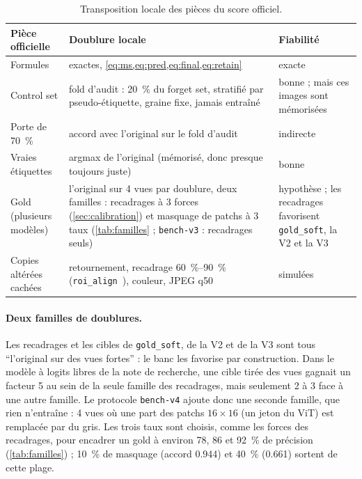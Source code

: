 \documentclass[11pt,a4paper]{article}
\newcommand{\code}[1]{\texttt{#1}}
\begin{document}
\begin{table}[ht]
  \centering\small
  \caption{Transposition locale des pièces du score officiel.}\label{tab:doublures}
  \begin{tabularx}{\linewidth}{@{}>{\raggedright}p{3.1cm}X>{\raggedright\arraybackslash}p{2.6cm}@{}}
    \toprule
    Pièce officielle & Doublure locale & Fiabilité\\
    \midrule
    Formules & exactes, \cref{eq:ms,eq:pred,eq:final,eq:retain} & exacte\\
    Control set & fold d'audit : \SI{20}{\percent} du forget set, stratifié par pseudo-étiquette,
      graine fixe, jamais entraîné & bonne ; mais ces images sont mémorisées\\
    Porte de \SI{70}{\percent} & accord avec l'original sur le fold d'audit & indirecte\\
    Vraies étiquettes & argmax de l'original (mémorisé, donc presque toujours juste) & bonne\\
    Gold (plusieurs modèles) & l'original sur 4 vues par doublure, deux familles : recadrages à 3
      forces (\cref{sec:calibration}) et masquage de patchs à 3 taux (\cref{tab:familles} ;
      \code{bench-v3} : recadrages seuls) & hypothèse ; les recadrages favorisent \code{gold\_soft},
      la V2 et la V3\\
    Copies altérées cachées & retournement, recadrage \SIrange{60}{90}{\percent}
      (\code{roi\_align}~\cite{he2017maskrcnn}), couleur, JPEG q50 & simulées\\
    \bottomrule
  \end{tabularx}
\end{table}

\paragraph{Deux familles de doublures.} Les recadrages et les cibles de \code{gold\_soft}, de la V2
et de la V3 sont tous \enquote{l'original sur des vues fortes} : le banc les favorise par
construction. Dans le modèle à logits libres de la note de recherche, une cible tirée des vues
gagnait un facteur 5 au sein de la seule famille des recadrages, mais seulement 2 à 3 face à une
autre famille. Le protocole \code{bench-v4} ajoute donc une seconde famille, que rien n'entraîne :
4 vues où une part des patchs $16\times16$ (un jeton du ViT) est remplacée par du gris. Les trois
taux sont choisis, comme les forces des recadrages, pour encadrer un gold à environ 78, 86 et
\SI{92}{\percent} de précision (\cref{tab:familles}) ; \SI{10}{\percent} de masquage
(accord \num{0.944}) et \SI{40}{\percent} (\num{0.661}) sortent de cette plage.
\end{document}
